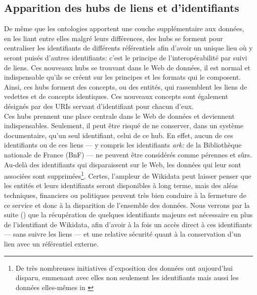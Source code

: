 \subsection{\label{III-A-2-b}Apparition des hubs de liens et d'identifiants}

De même que les ontologies apportent une couche supplémentaire aux données, en les liant entre elles malgré leurs différences, des hubs se forment pour centraliser les identifiants de différents référentiels afin d'avoir un unique lieu où y seront puisés d'autres identifiants: c'est le principe de l'interopérabilité par suivi de liens. Ces nouveaux hubs se trouvant dans le Web de données, il est normal et indispensable qu'ils se créent sur les principes et les formats qui le composent. Ainsi, ces hubs forment des concepts, ou des entités, qui rassemblent les liens de vedettes et de concepts identiques. Ces nouveaux concepts sont également désignés par des URIs servant d'identifiant pour chacun d'eux.\\

Ces hubs prennent une place centrale dans le Web de données et deviennent indispensables. Seulement, il peut être risqué de ne conserver, dans un système documentaire, qu'un seul identifiant, celui de ce hub. En effet, aucun de ces identifiants ou de ces liens --- y compris les identifiants \textit{ark:} de la Bibliothèque nationale de France (BnF) --- ne peuvent être considérés comme pérennes et sûrs. Au-delà des identifiants qui disparaissent sur le Web, les données qui leur sont associées sont supprimées\footnote{\og De très nombreuses initiatives d’exposition des données ont aujourd’hui disparu, emmenant avec elles non seulement les identifiants mais aussi les données elles-mêmes\fg{} in \cite{poupeau_au-a_2018}}. Certes, l'ampleur de Wikidata peut laisser penser que les entités et leurs identifiants seront disponibles à long terme, mais des aléas techniques, financiers ou politiques peuvent très bien conduire à la fermeture de ce service et donc à la disparition de l'ensemble des données. Nous verrons par la suite () que la récupération de quelques identifiants majeurs est nécessaire en plus de l'identifiant de Wikidata, afin d'avoir à la fois un accès direct à ces identifiants --- sans suivre les liens --- et une relative sécurité quant à la conservation d'un lien avec un référentiel externe.\\

